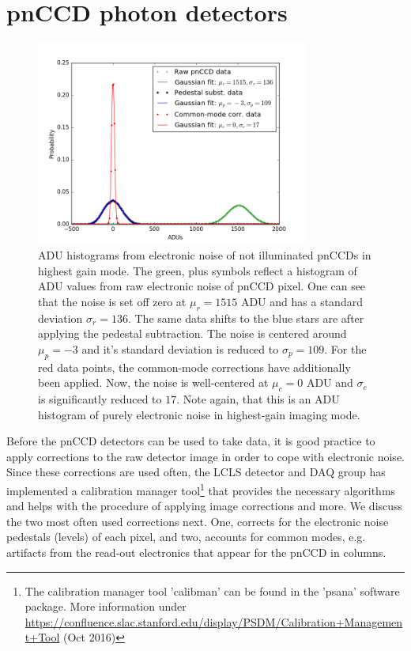 \section{pnCCD photon detectors}\label{sec:pnccd-corr}
\begin{figure}
	\centering
		\includegraphics[width=0.80\textwidth]{images/pnCCD-electronic-noise.png}
	\caption{ADU histograms from electronic noise of not illuminated pnCCDs in highest gain mode. The green, plus symbols reflect a histogram of ADU values from raw electronic noise of pnCCD pixel. One can see that the noise is set off zero at $\mu_{r}=1515$ ADU and has a standard deviation $\sigma_{r}=136$. The same data shifts to the blue stars are after applying the pedestal subtraction. The noise is centered around $\mu_{p}=-3$ and it's standard deviation is reduced to $\sigma_{p}=109$. For the red  data points, the common-mode corrections have additionally been applied. Now, the noise is well-centered at $\mu_{c}=0$ ADU and $\sigma_{c}$ is significantly reduced to $17$. Note again, that this is an ADU histogram of purely electronic noise in highest-gain imaging mode.}
	\label{fig:pnCCD-electronic-noise}
\end{figure}
Before the pnCCD detectors can be used to take data, it is good practice to apply corrections to the raw detector image in order to cope with electronic noise. Since these corrections are used often, the LCLS detector and DAQ group has implemented a calibration manager tool\footnote{The calibration manager tool 'calibman' can be found in the 'psana' software package. More information under \url{https://confluence.slac.stanford.edu/display/PSDM/Calibration+Management+Tool} (Oct 2016)} that provides the necessary algorithms and helps with the procedure of applying image corrections and more. We discuss the two most often used corrections next. One, corrects for the electronic noise pedestals (levels) of each pixel, and two, accounts for common modes, e.g. artifacts from the read-out electronics that appear for the pnCCD in columns.\\

